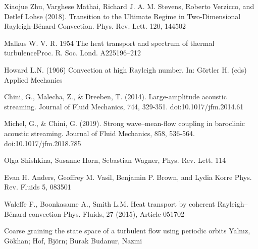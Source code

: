 \documentclass[reprint,amsmath,amssymb,aps]{revtex4-1}
\begin{document}
% 
\begin{thebibliography}{99} 

 Xiaojue Zhu, Varghese Mathai, Richard J. A. M. Stevens, Roberto Verzicco, and Detlef Lohse (2018). Transition to the Ultimate Regime in Two-Dimensional Rayleigh-Bénard Convection. Phys. Rev. Lett. 120, 144502

 Malkus W. V. R. 1954 The heat transport and spectrum of thermal turbulenceProc. R. Soc. Lond. A225196–212

 Howard L.N. (1966) Convection at high Rayleigh number. In: Görtler H. (eds) Applied Mechanics

 Chini, G., Malecha, Z., \& Dreeben, T. (2014). Large-amplitude acoustic streaming. Journal of Fluid Mechanics, 744, 329-351. doi:10.1017/jfm.2014.61

 Michel, G., \& Chini, G. (2019). Strong wave–mean-flow coupling in baroclinic acoustic streaming. Journal of Fluid Mechanics, 858, 536-564. doi:10.1017/jfm.2018.785

 Olga Shishkina, Susanne Horn, Sebastian Wagner, Phys. Rev. Lett. 114

 Evan H. Anders, Geoffrey M. Vasil, Benjamin P. Brown, and Lydia Korre Phys. Rev. Fluids 5, 083501

 Waleffe F., Boonkasame A., Smith L.M. Heat transport by coherent Rayleigh–Bénard convection Phys. Fluids, 27 (2015), Article 051702

 Coarse graining the state space of a turbulent flow using periodic orbits Yalnız, Gökhan; Hof, Björn; Burak Budanur, Nazmi

\end{thebibliography}
\end{document}
